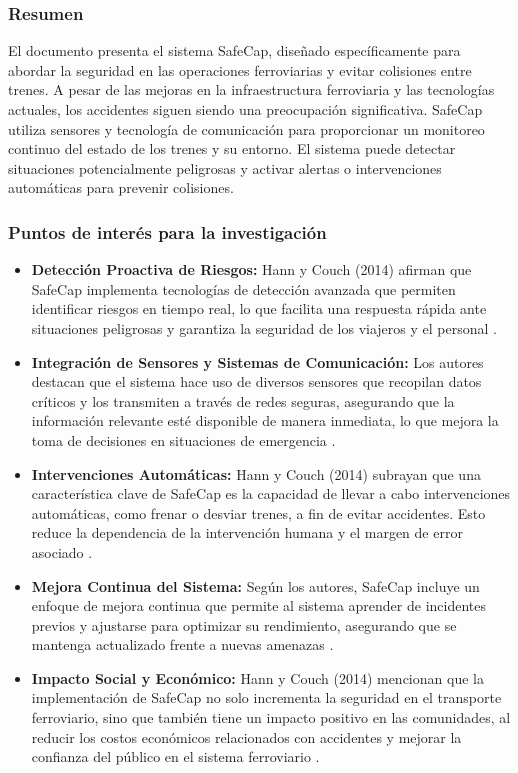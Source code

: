 \documentclass[journal]{IEEEtran}
\begin{document}
\subsubsection*{Resumen}  
El documento presenta el sistema SafeCap, diseñado específicamente para abordar la seguridad en las operaciones ferroviarias y evitar colisiones entre trenes. A pesar de las mejoras en la infraestructura ferroviaria y las tecnologías actuales, los accidentes siguen siendo una preocupación significativa. SafeCap utiliza sensores y tecnología de comunicación para proporcionar un monitoreo continuo del estado de los trenes y su entorno. El sistema puede detectar situaciones potencialmente peligrosas y activar alertas o intervenciones automáticas para prevenir colisiones.
\subsubsection*{Puntos de interés para la investigación}  
\begin{itemize}
    \item \textbf{Detección Proactiva de Riesgos:}  
    Hann y Couch (2014) afirman que SafeCap implementa tecnologías de detección avanzada que permiten identificar riesgos en tiempo real, lo que facilita una respuesta rápida ante situaciones peligrosas y garantiza la seguridad de los viajeros y el personal \cite{ada2014safecap}.   
    \item \textbf{Integración de Sensores y Sistemas de Comunicación:}  
    Los autores destacan que el sistema hace uso de diversos sensores que recopilan datos críticos y los transmiten a través de redes seguras, asegurando que la información relevante esté disponible de manera inmediata, lo que mejora la toma de decisiones en situaciones de emergencia \cite{ada2014safecap}.    
    \item \textbf{Intervenciones Automáticas:}  
    Hann y Couch (2014) subrayan que una característica clave de SafeCap es la capacidad de llevar a cabo intervenciones automáticas, como frenar o desviar trenes, a fin de evitar accidentes. Esto reduce la dependencia de la intervención humana y el margen de error asociado \cite{ada2014safecap}.   
    \item \textbf{Mejora Continua del Sistema:}  
    Según los autores, SafeCap incluye un enfoque de mejora continua que permite al sistema aprender de incidentes previos y ajustarse para optimizar su rendimiento, asegurando que se mantenga actualizado frente a nuevas amenazas \cite{ada2014safecap}.  
    \item \textbf{Impacto Social y Económico:}  
    Hann y Couch (2014) mencionan que la implementación de SafeCap no solo incrementa la seguridad en el transporte ferroviario, sino que también tiene un impacto positivo en las comunidades, al reducir los costos económicos relacionados con accidentes y mejorar la confianza del público en el sistema ferroviario \cite{ada2014safecap}.
\end{itemize}
\end{document}
